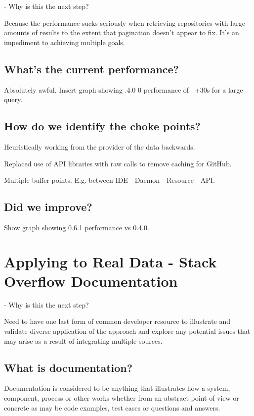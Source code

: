 - Why is this the next step?

Because the performance sucks seriously when retrieving repositories with large amounts of results to the extent that pagination doesn't appear to fix. It's an impediment to achieving multiple goals.

\subsection{What's the current performance?}

Absolutely awful. Insert graph showing .4.0 0 performance of ~+30s for a large query.

\subsection{How do we identify the choke points?}

Heuristically working from the provider of the data backwards.

Replaced use of API libraries with raw calls to remove caching for GitHub.

Multiple buffer points. E.g. between IDE - Daemon - Resource - API.

\subsection{Did we improve?}

Show graph showing 0.6.1 performance vs 0.4.0.

\section{Applying to Real Data - Stack Overflow Documentation}

- Why is this the next step?

Need to have one last form of common developer resource to illustrate and validate diverse application of the approach and explore any potential issues that may arise as a result of integrating multiple sources.

\subsection{What is documentation?}

Documentation is considered to be anything that illustrates how a system, component, process or other works whether from an abstract point of view or concrete as may be code examples, test cases or questions and answers.

